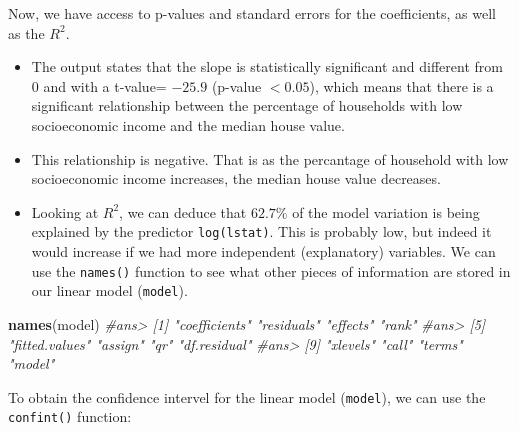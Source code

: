 \documentclass[]{book}
\newenvironment{Shaded}{\begin{snugshade}}{\end{snugshade}}
\newcommand{\KeywordTok}[1]{\textcolor[rgb]{0.13,0.29,0.53}{\textbf{#1}}}
\newcommand{\DataTypeTok}[1]{\textcolor[rgb]{0.13,0.29,0.53}{#1}}
\newcommand{\FloatTok}[1]{\textcolor[rgb]{0.00,0.00,0.81}{#1}}
\newcommand{\CommentTok}[1]{\textcolor[rgb]{0.56,0.35,0.01}{\textit{#1}}}
\newcommand{\OperatorTok}[1]{\textcolor[rgb]{0.81,0.36,0.00}{\textbf{#1}}}
\newcommand{\NormalTok}[1]{#1}
\providecommand{\tightlist}{%
  \setlength{\itemsep}{0pt}\setlength{\parskip}{0pt}}
\begin{document}
Now, we have access to p-values and standard errors for the
coefficients, as well as the \(R^2\).

\begin{itemize}
\tightlist
\item
  The output states that the slope is statistically significant and
  different from \(0\) and with a t-value= \(-25.9\) (p-value
  \(< 0.05\)), which means that there is a significant relationship
  between the percentage of households with low socioeconomic income and
  the median house value.
\item
  This relationship is negative. That is as the percantage of household
  with low socioeconomic income increases, the median house value
  decreases.
\item
  Looking at \(R^2\), we can deduce that \(62.7\%\) of the model
  variation is being explained by the predictor \texttt{log(lstat)}.
  This is probably low, but indeed it would increase if we had more
  independent (explanatory) variables. We can use the \texttt{names()}
  function to see what other pieces of information are stored in our
  linear model (\texttt{model}).
\end{itemize}

\begin{Shaded}
\begin{Highlighting}[]
\KeywordTok{names}\NormalTok{(model)}
\CommentTok{#ans>  [1] "coefficients"  "residuals"     "effects"       "rank"         }
\CommentTok{#ans>  [5] "fitted.values" "assign"        "qr"            "df.residual"  }
\CommentTok{#ans>  [9] "xlevels"       "call"          "terms"         "model"}
\end{Highlighting}
\end{Shaded}

\begin{Shaded}
\end{Shaded}

To obtain the confidence intervel for the linear model (\texttt{model}),
we can use the \texttt{confint()} function:

\begin{Shaded}
\end{Shaded}
\end{document}
